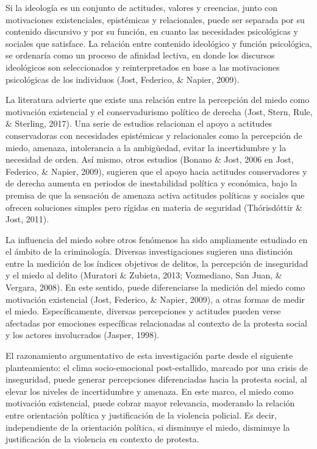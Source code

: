 \documentclass[12pt,twoside]{templates/facsothesis}
\begin{document}
Si la ideología es un conjunto de actitudes, valores y creencias, junto con motivaciones existenciales, epistémicas y relacionales, puede ser separada por su contenido discursivo y por su función, en cuanto las necesidades psicológicas y sociales que satisface. La relación entre contenido ideológico y función psicológica, se ordenaría como un proceso de afinidad lectiva, en donde los discursos ideológicos son seleccionados y reinterpretados en base a las motivaciones psicológicas de los individuos (Jost, Federico, \& Napier, 2009).

La literatura advierte que existe una relación entre la percepción del miedo como motivación existencial y el conservadurismo político de derecha (Jost, Stern, Rule, \& Sterling, 2017). Una serie de estudios relacionan el apoyo a actitudes conservadoras con necesidades epistémicas y relacionales como la percepción de miedo, amenaza, intolerancia a la ambigüedad, evitar la incertidumbre y la necesidad de orden. Así mismo, otros estudios (Bonano \& Jost, 2006 en Jost, Federico, \& Napier, 2009), sugieren que el apoyo hacia actitudes conservadores y de derecha aumenta en periodos de inestabilidad política y económica, bajo la premisa de que la sensación de amenaza activa actitudes políticas y sociales que ofrecen soluciones simples pero rígidas en materia de seguridad (Thórisdóttir \& Jost, 2011).

La influencia del miedo sobre otros fenómenos ha sido ampliamente estudiado en el ámbito de la criminología. Diversas investigaciones sugieren una distinción entre la medición de los índices objetivos de delitos, la percepción de inseguridad y el miedo al delito (Muratori \& Zubieta, 2013; Vozmediano, San Juan, \& Vergara, 2008). En este sentido, puede diferenciarse la medición del miedo como motivación existencial (Jost, Federico, \& Napier, 2009), a otras formas de medir el miedo. Específicamente, diversas percepciones y actitudes pueden verse afectadas por emociones específicas relacionadas al contexto de la protesta social y los actores involucrados (Jasper, 1998).

El razonamiento argumentativo de esta investigación parte desde el siguiente planteamiento: el clima socio-emocional post-estallido, marcado por una crisis de inseguridad, puede generar percepciones diferenciadas hacia la protesta social, al elevar los niveles de incertidumbre y amenaza. En este marco, el miedo como motivación existencial, puede cobrar mayor relevancia, moderando la relación entre orientación política y justificación de la violencia policial. Es decir, independiente de la orientación política, si disminuye el miedo, disminuye la justificación de la violencia en contexto de protesta.
\end{document}
